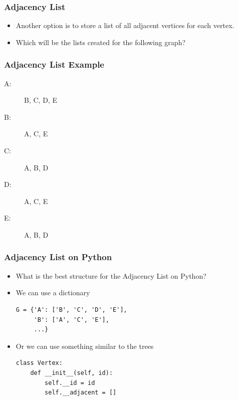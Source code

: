 \documentclass[11pt]{beamer}
\begin{document}
\begin{frame}\frametitle{Adjacency List}
\begin{itemize}
\item Another option is to store a list of all adjacent vertices for each vertex.
\pause
\item Which will be the lists created for the following graph?
\end{itemize}
\begin{center}
\end{center}
\end{frame}


\begin{frame}\frametitle{Adjacency List Example}
\begin{description}
\item[A:] B, C, D, E
\item[B:] A, C, E
\item[C:] A, B, D
\item[D:] A, C, E
\item[E:] A, B, D
\end{description}
\end{frame}

\begin{frame}[fragile]\frametitle{Adjacency List on Python}
\begin{itemize}
\item What is the best structure for the Adjacency List on Python?
\pause
\item We can use a dictionary
\begin{lstlisting}
G = {'A': ['B', 'C', 'D', 'E'], 
     'B': ['A', 'C', 'E'],
     ...}
\end{lstlisting}
\pause
\item Or we can use something similar to the trees
\begin{lstlisting}
class Vertex:
    def __init__(self, id):
        self.__id = id
        self.__adjacent = []
\end{lstlisting}
\end{itemize}
\end{frame}
\end{document}
